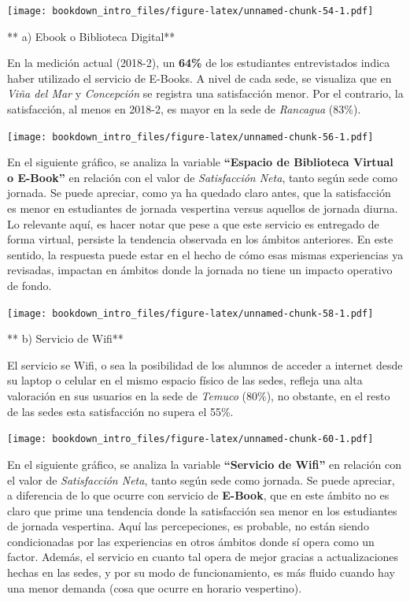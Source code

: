 \documentclass[]{book}
\begin{document}
\texttt{[image: bookdown\_intro\_files/figure-latex/unnamed-chunk-54-1.pdf]}

** a) Ebook o Biblioteca Digital**

En la medición actual (2018-2), un \textbf{64\%} de los estudiantes
entrevistados indica haber utilizado el servicio de E-Books. A nivel de
cada sede, se visualiza que en \emph{Viña del Mar} y \emph{Concepción}
se registra una satisfacción menor. Por el contrario, la satisfacción,
al menos en 2018-2, es mayor en la sede de \emph{Rancagua} (83\%).

\texttt{[image: bookdown\_intro\_files/figure-latex/unnamed-chunk-56-1.pdf]}

En el siguiente gráfico, se analiza la variable \textbf{``Espacio de
Biblioteca Virtual o E-Book''} en relación con el valor de
\emph{Satisfacción Neta}, tanto según sede como jornada. Se puede
apreciar, como ya ha quedado claro antes, que la satisfacción es menor
en estudiantes de jornada vespertina versus aquellos de jornada diurna.
Lo relevante aquí, es hacer notar que pese a que este servicio es
entregado de forma virtual, persiste la tendencia observada en los
ámbitos anteriores. En este sentido, la respuesta puede estar en el
hecho de cómo esas mismas experiencias ya revisadas, impactan en ámbitos
donde la jornada no tiene un impacto operativo de fondo.

\texttt{[image: bookdown\_intro\_files/figure-latex/unnamed-chunk-58-1.pdf]}

** b) Servicio de Wifi**

El servicio se Wifi, o sea la posibilidad de los alumnos de acceder a
internet desde su laptop o celular en el mismo espacio físico de las
sedes, refleja una alta valoración en sus usuarios en la sede de
\emph{Temuco} (80\%), no obstante, en el resto de las sedes esta
satisfacción no supera el 55\%.

\texttt{[image: bookdown\_intro\_files/figure-latex/unnamed-chunk-60-1.pdf]}

En el siguiente gráfico, se analiza la variable \textbf{``Servicio de
Wifi''} en relación con el valor de \emph{Satisfacción Neta}, tanto
según sede como jornada. Se puede apreciar, a diferencia de lo que
ocurre con servicio de \textbf{E-Book}, que en este ámbito no es claro
que prime una tendencia donde la satisfacción sea menor en los
estudiantes de jornada vespertina. Aquí las percepeciones, es probable,
no están siendo condicionadas por las experiencias en otros ámbitos
donde sí opera como un factor. Además, el servicio en cuanto tal opera
de mejor gracias a actualizaciones hechas en las sedes, y por su modo de
funcionamiento, es más fluido cuando hay una menor demanda (cosa que
ocurre en horario vespertino).
\end{document}
